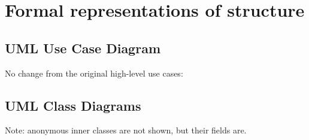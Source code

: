 \documentclass[11pt,asymmetric]{article}
\newcommand\gr[2]{\scalebox{#2}{\texttt{[image: \#1]}}}
\begin{document}
\section{Formal representations of structure}
\subsection{UML Use Case Diagram}
No change from the original high-level use cases: \begin{center}\gr{umd_use_case_diagram_01.png}{.1}\end{center}

\subsection{UML Class Diagrams}

Note: anonymous inner classes are not shown, but their fields are.
\end{document}
